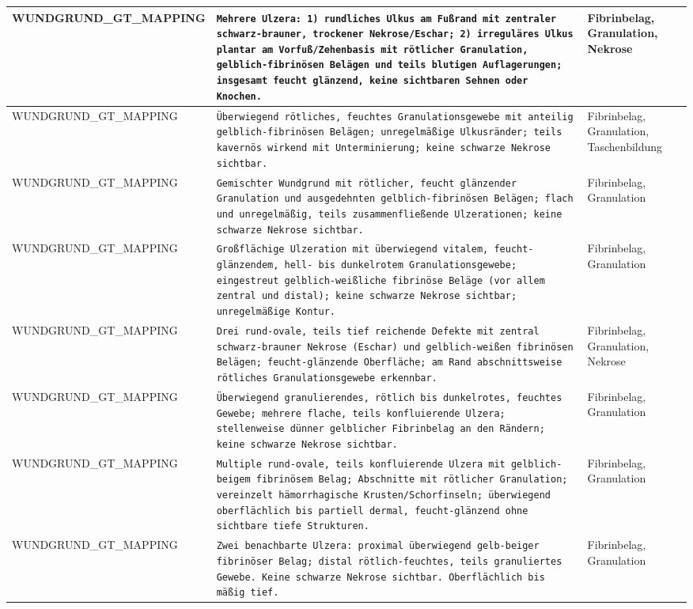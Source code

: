 \begin{longtable}{|p{3.5cm}|p{5cm}|p{6.5cm}|}
WUNDGRUND\_GT\_MAPPING & \texttt{Mehrere Ulzera: 1) rundliches Ulkus am Fußrand mit zentraler schwarz‑brauner, trockener Nekrose/Eschar; 2) irreguläres Ulkus plantar am Vorfuß/Zehenbasis mit rötlicher Granulation, gelblich-fibrinösen Belägen und teils blutigen Auflagerungen; insgesamt feucht glänzend, keine sichtbaren Sehnen oder Knochen.} & Fibrinbelag, Granulation, Nekrose \\ \hline
WUNDGRUND\_GT\_MAPPING & \texttt{Überwiegend rötliches, feuchtes Granulationsgewebe mit anteilig gelblich-fibrinösen Belägen; unregelmäßige Ulkusränder; teils kavernös wirkend mit Unterminierung; keine schwarze Nekrose sichtbar.} & Fibrinbelag, Granulation, Taschenbildung \\ \hline
WUNDGRUND\_GT\_MAPPING & \texttt{Gemischter Wundgrund mit rötlicher, feucht glänzender Granulation und ausgedehnten gelblich-fibrinösen Belägen; flach und unregelmäßig, teils zusammenfließende Ulzerationen; keine schwarze Nekrose sichtbar.} & Fibrinbelag, Granulation \\ \hline
WUNDGRUND\_GT\_MAPPING & \texttt{Großflächige Ulzeration mit überwiegend vitalem, feucht-glänzendem, hell- bis dunkelrotem Granulationsgewebe; eingestreut gelblich-weißliche fibrinöse Beläge (vor allem zentral und distal); keine schwarze Nekrose sichtbar; unregelmäßige Kontur.} & Fibrinbelag, Granulation \\ \hline
WUNDGRUND\_GT\_MAPPING & \texttt{Drei rund-ovale, teils tief reichende Defekte mit zentral schwarz-brauner Nekrose (Eschar) und gelblich-weißen fibrinösen Belägen; feucht-glänzende Oberfläche; am Rand abschnittsweise rötliches Granulationsgewebe erkennbar.} & Fibrinbelag, Granulation, Nekrose \\ \hline
WUNDGRUND\_GT\_MAPPING & \texttt{Überwiegend granulierendes, rötlich bis dunkelrotes, feuchtes Gewebe; mehrere flache, teils konfluierende Ulzera; stellenweise dünner gelblicher Fibrinbelag an den Rändern; keine schwarze Nekrose sichtbar.} & Fibrinbelag, Granulation \\ \hline
WUNDGRUND\_GT\_MAPPING & \texttt{Multiple rund-ovale, teils konfluierende Ulzera mit gelblich-beigem fibrinösem Belag; Abschnitte mit rötlicher Granulation; vereinzelt hämorrhagische Krusten/Schorfinseln; überwiegend oberflächlich bis partiell dermal, feucht-glänzend ohne sichtbare tiefe Strukturen.} & Fibrinbelag, Granulation \\ \hline
WUNDGRUND\_GT\_MAPPING & \texttt{Zwei benachbarte Ulzera: proximal überwiegend gelb-beiger fibrinöser Belag; distal rötlich-feuchtes, teils granuliertes Gewebe. Keine schwarze Nekrose sichtbar. Oberflächlich bis mäßig tief.} & Fibrinbelag, Granulation \\ \hline

\end{longtable}
